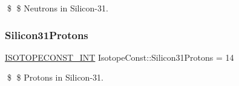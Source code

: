 \$ \$ Neutrons in Silicon-\/31. \mbox{\label{group___isotope_const-_silicon-_si31_gafedc2a23c861d119bdfa02ac6f7eb315}} 
\subsubsection{\texorpdfstring{Silicon31\+Protons}{Silicon31Protons}}
{\footnotesize\ttfamily \mbox{\hyperlink{group___isotope_const-_macros_ga5f18360b3e99483a35c32d789e62621c}{I\+S\+O\+T\+O\+P\+E\+C\+O\+N\+S\+T\+\_\+\+I\+NT}} Isotope\+Const\+::\+Silicon31\+Protons = 14}

\$ \$ Protons in Silicon-\/31. 